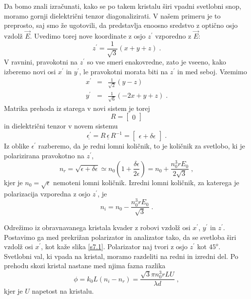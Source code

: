 Da bomo znali izračunati, kako se po takem kristalu širi vpadni svetlobni
snop, moramo gornji dielektrični tenzor diagonalizirati. V našem primeru
je to preprosto, saj smo že ugotovili, da predstavlja enoosno sredstvo
z optično osjo vzdolž $\vec{E}$. Uvedimo torej nove koordinate z
osjo $z^{\prime}$ vzporedno z $\vec{E}$: 
\begin{equation}
z^{\prime}=\frac{1}{\sqrt{3}}(x+y+z)\;.\label{7.9}
\end{equation}
 V ravnini, pravokotni na $z^{\prime}$ so vse smeri enakovredne,
zato je vseeno, kako izberemo novi osi $x^{\prime}$ in $y^{\prime}$,
le pravokotni morata biti na $z^{\prime}$ in med seboj. Vzemimo 
\begin{eqnarray}
x^{\prime} & = & \frac{1}{\sqrt{2}}(y-z)\nonumber \\
y^{\prime} & = & \frac{1}{\sqrt{6}}(-2x+y+z)\;.
\end{eqnarray}
 Matrika prehoda iz starega v novi sistem je torej 
\begin{equation}
R=\left[\begin{matrix}0\end{matrix}\right]\label{7.11}
\end{equation}
 in dielektrični tenzor v novem sistemu 
\begin{equation}
\underline{\epsilon^{\prime}}=R\,\underline{\epsilon}\, R^{-1}=\left[\begin{matrix}\epsilon+\delta\epsilon\end{matrix}\right]\;.\label{7.12}
\end{equation}
 Iz oblike $\epsilon^{\prime}$ razberemo, da je redni lomni količnik,
to je količnik za svetlobo, ki je polarizirana pravokotno na $z^{\prime}$,
\begin{equation}
n_{r}=\sqrt{\epsilon+\delta\epsilon}\simeq n_{0}(1+\frac{\delta\epsilon}{2\epsilon})=n_{0}+\frac{n_{0}^{3}rE_{0}}{2\sqrt{3}}\;,\label{7.13}
\end{equation}
 kjer je $n_{0}=\sqrt{\epsilon}$ nemoteni lomni količnik. Izredni
lomni količnik, za katerega je polarizacija vzporedna z osjo $z^{\prime}$,
je 
\begin{equation}
n_{i}=n_{0}-\frac{n_{0}^{3}rE_{0}}{\sqrt{3}}\;.\label{7.14}
\end{equation}


Odrežimo iz obravnavanega kristala kvader z robovi vzdolž osi $x^{\prime}$,
$y^{\prime}$ in $z^{\prime}$. Postavimo ga med prekrižan polarizator
in analizator tako, da se svetloba širi vzdolž osi $x^{\prime}$,
kot kaže slika \ref{s7.1}. Polarizator naj tvori z osjo $z^{\prime}$
kot $45^{o}$. Svetlobni val, ki vpada na kristal, moramo razdeliti
na redni in izredni del. Po prehodu skozi kristal nastane med njima
fazna razlika 
\begin{equation}
\phi=k_{0}L(n_{i}-n_{r})=\frac{\sqrt{3}\pi n_{0}^{3}rLU}{\lambda d}\;,\label{7.15}
\end{equation}
 kjer je $U$ napetost na kristalu.

